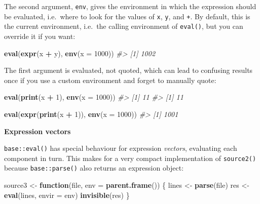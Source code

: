 \documentclass[]{book}
\newenvironment{Shaded}{\begin{snugshade}}{\end{snugshade}}
\newcommand{\CommentTok}[1]{\textcolor[rgb]{0.37,0.37,0.37}{\textit{#1}}}
\newcommand{\ControlFlowTok}[1]{\textcolor[rgb]{0.27,0.27,0.27}{\textbf{#1}}}
\newcommand{\DataTypeTok}[1]{\textcolor[rgb]{0.27,0.27,0.27}{#1}}
\newcommand{\DecValTok}[1]{\textcolor[rgb]{0.06,0.06,0.06}{#1}}
\newcommand{\KeywordTok}[1]{\textcolor[rgb]{0.27,0.27,0.27}{\textbf{#1}}}
\newcommand{\NormalTok}[1]{#1}
\newcommand{\OperatorTok}[1]{\textcolor[rgb]{0.43,0.43,0.43}{\textbf{#1}}}
\newcommand{\StringTok}[1]{\textcolor[rgb]{0.5,0.5,0.5}{#1}}
\begin{document}
The second argument, \texttt{env}, gives the environment in which the expression should be evaluated, i.e.~where to look for the values of \texttt{x}, \texttt{y}, and \texttt{+}. By default, this is the current environment, i.e.~the calling environment of \texttt{eval()}, but you can override it if you want:

\begin{Shaded}
\begin{Highlighting}[]
\KeywordTok{eval}\NormalTok{(}\KeywordTok{expr}\NormalTok{(x }\OperatorTok{+}\StringTok{ }\NormalTok{y), }\KeywordTok{env}\NormalTok{(}\DataTypeTok{x =} \DecValTok{1000}\NormalTok{))}
\CommentTok{#> [1] 1002}
\end{Highlighting}
\end{Shaded}

The first argument is evaluated, not quoted, which can lead to confusing results once if you use a custom environment and forget to manually quote:

\begin{Shaded}
\begin{Highlighting}[]
\KeywordTok{eval}\NormalTok{(}\KeywordTok{print}\NormalTok{(x }\OperatorTok{+}\StringTok{ }\DecValTok{1}\NormalTok{), }\KeywordTok{env}\NormalTok{(}\DataTypeTok{x =} \DecValTok{1000}\NormalTok{))}
\CommentTok{#> [1] 11}
\CommentTok{#> [1] 11}

\KeywordTok{eval}\NormalTok{(}\KeywordTok{expr}\NormalTok{(}\KeywordTok{print}\NormalTok{(x }\OperatorTok{+}\StringTok{ }\DecValTok{1}\NormalTok{)), }\KeywordTok{env}\NormalTok{(}\DataTypeTok{x =} \DecValTok{1000}\NormalTok{))}
\CommentTok{#> [1] 1001}
\end{Highlighting}
\end{Shaded}

\textbf{Expression vectors}

\texttt{base::eval()} has special behaviour for expression \emph{vectors}, evaluating each component in turn. This makes for a very compact implementation of \texttt{source2()} because \texttt{base::parse()} also returns an expression object:

\begin{Shaded}
\begin{Highlighting}[]
\NormalTok{source3 <-}\StringTok{ }\ControlFlowTok{function}\NormalTok{(file, }\DataTypeTok{env =} \KeywordTok{parent.frame}\NormalTok{()) \{}
\NormalTok{  lines <-}\StringTok{ }\KeywordTok{parse}\NormalTok{(file)}
\NormalTok{  res <-}\StringTok{ }\KeywordTok{eval}\NormalTok{(lines, }\DataTypeTok{envir =}\NormalTok{ env)}
  \KeywordTok{invisible}\NormalTok{(res)}
\NormalTok{\}}
\end{Highlighting}
\end{Shaded}
\end{document}

